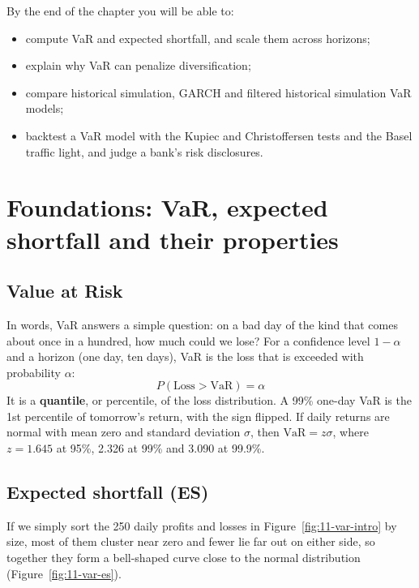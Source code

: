 By the end of the chapter you will be able to:

\begin{itemize}[nosep]
  \item compute VaR and expected shortfall, and scale them across horizons;
  \item explain why VaR can penalize diversification;
  \item compare historical simulation, GARCH and filtered historical simulation VaR models;
  \item backtest a VaR model with the Kupiec and Christoffersen tests and the Basel traffic light, and judge a bank's risk disclosures.
\end{itemize}


\section{Foundations: VaR, expected shortfall and their properties}
\label{sec:11-foundations}

\subsection{Value at Risk}

In words, VaR answers a simple question: on a bad day of the kind that comes about once in a hundred, how much could we lose? For a confidence level $1 - \alpha$ and a horizon (one day, ten days), VaR is the loss that is exceeded with probability $\alpha$:
\begin{equation}
  P(\text{Loss} > \mathrm{VaR}) = \alpha
  \label{eq:11-var}
\end{equation}
It is a \textbf{quantile}, or percentile, of the loss distribution. A 99\% one-day VaR is the 1st percentile of tomorrow's return, with the sign flipped. If daily returns are normal with mean zero and standard deviation $\sigma$, then $\mathrm{VaR} = z\sigma$, where $z = 1.645$ at 95\%, 2.326 at 99\% and 3.090 at 99.9\%.

\subsection{Expected shortfall (ES)}
If we simply sort the 250 daily profits and losses in Figure~\ref{fig:11-var-intro} by size, most of them cluster near zero and fewer lie far out on either side, so together they form a bell-shaped curve close to the normal distribution (Figure~\ref{fig:11-var-es}). 


